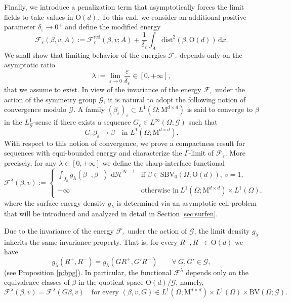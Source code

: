 \documentclass[a4paper,reqno]{amsart}
\newcommand{\BV}{\mathrm{BV}}
\newcommand{\SBV}{\mathrm{SBV}}
\newcommand\calH{\mathcal{H}}
\newcommand\LG{{L}^1_\G}
\newcommand\dist{{\mathrm{dist}}}
\theoremstyle{remark}
\def\e{\varepsilon}
\newcommand\dx{{\,\mathrm{d}x}}
\newcommand{\F}{\mathcal{F}}
\newcommand{\G}{\mathcal{G}}
\newcommand{\Fr}{\F^{\mathrm{red}}}
\newcommand{\On}{\mathrm{O}(d)}
\newcommand{\OnG}{{\On}/{\G}}
\newcommand{\Mno}{\mathrm{M}^{d\times d}}
\newcommand{\dhN}{{\,\mathrm{d}\calH^{N-1}}}
\numberwithin{equation}{section}
\begin{document}
Finally, we introduce a penalization term that asymptotically
 forces the limit fields  to take values  in
$\On$. To this end, we consider an additional positive parameter $\delta_\e\to 0^+$ and define
the modified energy
\begin{equation}\label{2611231323}
	\F_\varepsilon(\beta,v;A):=
	\Fr_\varepsilon(\beta,v;A) + \frac{1}{\delta_\varepsilon} \int_A \dist^2(\beta, \On) \dx.
\end{equation}
We shall show that
limiting behavior of the energies $\F_\varepsilon$ depends only on the asymptotic ratio
\begin{equation}\label{1002241910}
	\lambda:=\lim_{\varepsilon\to 0}\frac{\varepsilon}{\delta_\varepsilon}\in [0,+\infty],
\end{equation}
that we assume to exist.
In view of the invariance of the energy $\F_\e$ under the action of the symmetry group $\G$,  it is natural to adopt the following notion of convergence modulo $\G$.
A family $(\beta_\varepsilon)_\varepsilon\subset L^1(\Omega; \Mno)$ is said to converge to $\beta$ in the $\LG$-sense if
 there exists a sequence $G_\varepsilon\in L^\infty(\Omega; \G)$ such that
\begin{equation}\label{0602242311}
	G_\varepsilon \beta_\varepsilon \to \beta \quad \text{in }L^1(\Omega; \Mno).
\end{equation}
With respect to this notion of convergence,  we prove a compactness result for sequences with equi-bounded energy and  characterize the $\Gamma$-limit of $\F_\e$. More precisely,
for any $\lambda \in [0,+\infty]$ we define the sharp-interface functional
\begin{equation}\label{f:fzero}
	\F^\lambda (\beta,v):=
	\begin{cases}\displaystyle 
		\int_{J_\beta} g_\lambda( \beta^-,\beta^+)\, \dhN & \text{if } \beta\in \SBV_0(\Omega;\On) ,\ v=1,\\
		+\infty  & \text{otherwise in}\   L^1(\Omega; {\Mno})\times L^1(\Omega),
	\end{cases}
\end{equation}
where the surface energy density $g_\lambda$ is determined via an asymptotic cell problem that will be introduced and analyzed in detail in Section \ref{sec:surfen}.

Due to the invariance of the energy $\F_\e$ under the action of $\G$, the limit density $g_\lambda$ inherits the same invariance property. That is, for every $R^+,R^-\in \On$ we have
\begin{equation}
	\label{eq-glambda-invariance}
	g_\lambda(R^+,R^-)=g_\lambda(GR^+,G'R^-)\qquad \forall \ G,G'\in \G,
\end{equation}
(see Proposition \ref{p:bpg}).
In particular, the functional $\F^\lambda$ depends only on the equivalence classes of $\beta$ in the quotient space  $\OnG$, namely,
\begin{equation}\label{eq-limit-classi}
	\F^\lambda(\beta,v)=\F^\lambda(G\beta,v) \quad\text{for every }  (\beta,v,G) \in L^1(\Omega; {\Mno})\times L^1(\Omega)\times  \BV(\Omega;\G).
\end{equation}
\end{document}
